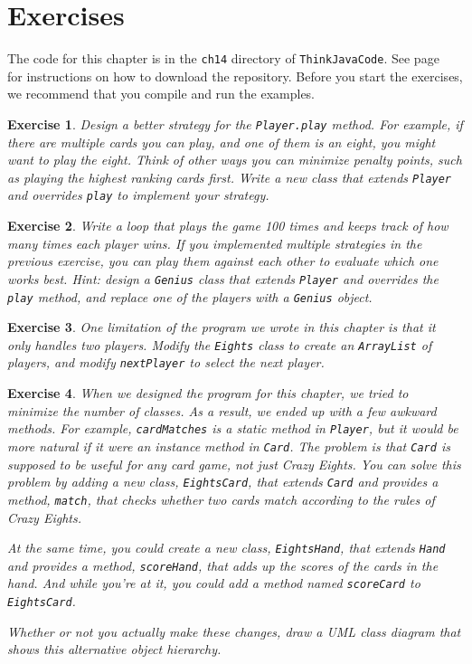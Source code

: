 \documentclass[12pt]{book}
\theoremstyle{exercise}
\newtheorem{exercise}{Exercise}[chapter]
\newcommand{\java}[1]{\verb"#1"}
\begin{document}
\section{Exercises}

The code for this chapter is in the {\tt ch14} directory of {\tt ThinkJavaCode}.
See page~\pageref{code} for instructions on how to download the repository.
Before you start the exercises, we recommend that you compile and run the examples.

\begin{exercise}
Design a better strategy for the \java{Player.play} method.
For example, if there are multiple cards you can play, and one of them is an eight, you might want to play the eight.
Think of other ways you can minimize penalty points, such as playing the highest ranking cards first.
Write a new class that extends \java{Player} and overrides \java{play} to implement your strategy.
\end{exercise}


\begin{exercise}
Write a loop that plays the game 100 times and keeps track of how many times each player wins.
If you implemented multiple strategies in the previous exercise, you can play them against each other to evaluate which one works best.
Hint: design a \java{Genius} class that extends \java{Player} and overrides the \java{play} method, and replace one of the players with a \java{Genius} object.
\end{exercise}


\begin{exercise}
One limitation of the program we wrote in this chapter is that it only handles two players.
Modify the \java{Eights} class to create an \java{ArrayList} of players, and modify \java{nextPlayer} to select the next player.
\end{exercise}


\begin{exercise}
When we designed the program for this chapter, we tried to minimize the number of classes.
As a result, we ended up with a few awkward methods.
For example, \java{cardMatches} is a static method in \java{Player}, but it would be more natural if it were an instance method in \java{Card}.
The problem is that \java{Card} is supposed to be useful for any card game, not just {\em Crazy Eights}.
You can solve this problem by adding a new class, \java{EightsCard}, that extends \java{Card} and provides a method, \java{match}, that checks whether two cards match according to the rules of {\em Crazy Eights}.

At the same time, you could create a new class, \java{EightsHand}, that extends \java{Hand} and provides a method, \java{scoreHand}, that adds up the scores of the cards in the hand.
And while you're at it, you could add a method named \java{scoreCard} to \java{EightsCard}.

Whether or not you actually make these changes, draw a UML class diagram that shows this alternative object hierarchy.
\end{exercise}
\end{document}
